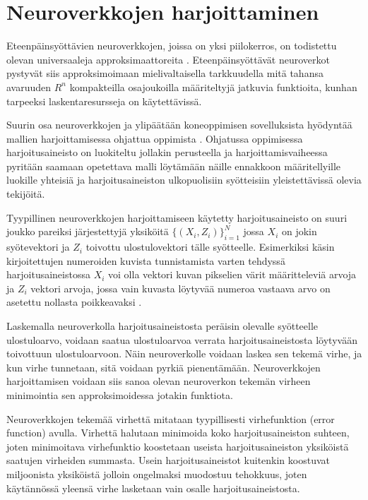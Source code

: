 \documentclass[finnish]{tktltiki2}
\theoremstyle{definition}
\theoremstyle{remark}
\begin{document}
  \section{Neuroverkkojen harjoittaminen}
    \label{chap:neural-training}

  Eteenpäinsyöttävien neuroverkkojen, joissa on yksi piilokerros, on todistettu olevan universaaleja approksimaattoreita \cite{multilayer-feedforward-universal-approximators}. Eteenpäinsyöttävät neuroverkot pystyvät siis approksimoimaan mielivaltaisella tarkkuudella mitä tahansa avaruuden $R^n$ kompakteilla osajoukoilla määriteltyjä jatkuvia funktioita, kunhan tarpeeksi laskentaresursseja on käytettävissä.
  

  Suurin osa neuroverkkojen ja ylipäätään koneoppimisen sovelluksista hyödyntää mallien harjoittamisessa ohjattua oppimista \cite{nature-lecun15}. Ohjatussa oppimisessa harjoitusaineisto on luokiteltu jollakin perusteella ja harjoittamisvaiheessa pyritään saamaan opetettava malli löytämään näille ennakkoon määritellyille luokille yhteisiä ja harjoitusaineiston ulkopuolisiin syötteisiin yleistettävissä olevia tekijöitä. 
  
  Tyypillinen neuroverkkojen harjoittamiseen käytetty harjoitusaineisto on suuri joukko pareiksi järjestettyjä yksiköitä $ \{(X_i, Z_i)\}_{i=1}^N $ jossa $X_i$ on jokin syötevektori ja $Z_i$ toivottu ulostulovektori tälle syötteelle. Esimerkiksi käsin kirjoitettujen numeroiden kuvista tunnistamista varten tehdyssä harjoitusaineistossa $X_i$ voi olla vektori kuvan pikselien värit määritteleviä arvoja ja $Z_i$ vektori arvoja, jossa vain kuvasta löytyvää numeroa vastaava arvo on asetettu nollasta poikkeavaksi \cite{Nielsen-neural}.

  Laskemalla neuroverkolla harjoitusaineistosta peräisin olevalle syötteelle ulostuloarvo, voidaan saatua ulostuloarvoa verrata harjoitusaineistosta löytyvään toivottuun ulostuloarvoon. Näin neuroverkolle voidaan laskea sen tekemä virhe, ja kun virhe tunnetaan, sitä voidaan pyrkiä pienentämään. 
  Neuroverkkojen harjoittamisen voidaan siis sanoa olevan neuroverkon tekemän virheen minimointia sen approksimoidessa jotakin funktiota.
  
  Neuroverkkojen tekemää virhettä mitataan tyypillisesti virhefunktion (error function) avulla. Virhettä halutaan minimoida koko harjoitusaineiston suhteen, joten minimoitava virhefunktio koostetaan useista harjoitusaineiston yksiköistä saatujen virheiden summasta. Usein harjoitusaineistot kuitenkin koostuvat miljoonista yksiköistä jolloin ongelmaksi muodostuu tehokkuus, joten käytännössä yleensä virhe lasketaan vain osalle harjoitusaineistosta.
\end{document}
